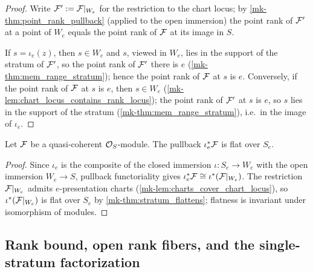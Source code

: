 \begin{proof}
  \leanok
  Write \(\mathcal{F}' := \mathcal{F}|_{W_e}\) for the restriction to the chart locus; by
  \ref{mk-thm:point_rank_pullback} (applied to the open immersion) the point
  rank of \(\mathcal{F}'\) at a point of \(W_e\) equals the point rank of \(\mathcal{F}\) at
  its image in \(S\).

  If \(s = \iota_e(z)\), then \(s \in W_e\) and \(s\), viewed in \(W_e\),
  lies in the support of the stratum of \(\mathcal{F}'\), so the point rank of
  \(\mathcal{F}'\) there is \(e\) (\ref{mk-thm:mem_range_stratum}); hence the point
  rank of \(\mathcal{F}\) at \(s\) is \(e\).  Conversely, if the point rank of
  \(\mathcal{F}\) at \(s\) is \(e\), then \(s \in W_e\)
  (\ref{mk-lem:chart_locus_contains_rank_locus}); the point rank of \(\mathcal{F}'\)
  at \(s\) is \(e\), so \(s\) lies in the support of the stratum
  (\ref{mk-thm:mem_range_stratum}), i.e.\ in the image of \(\iota_e\).
\end{proof}

\begin{theorem}
  \label{mk-thm:rank_stratum_flattens}
  \leanok

  Let \(\mathcal{F}\) be a quasi-coherent \(\mathcal{O}_S\)-module.  The pullback
  \(\iota_e^*\mathcal{F}\) is flat over \(S_e\).
\end{theorem}

\begin{proof}
  \leanok
  Since \(\iota_e\) is the composite of the closed immersion
  \(\iota : S_e \to W_e\) with the open immersion \(W_e \to S\), pullback
  functoriality gives \(\iota_e^*\mathcal{F} \cong \iota^*(\mathcal{F}|_{W_e})\).  The
  restriction \(\mathcal{F}|_{W_e}\) admits \(e\)-presentation charts
  (\ref{mk-lem:charts_cover_chart_locus}), so \(\iota^*(\mathcal{F}|_{W_e})\) is flat
  over \(S_e\) by \ref{mk-thm:stratum_flattens}; flatness is invariant under
  isomorphism of modules.
\end{proof}

\subsection{Rank bound, open rank fibers, and the single-stratum
  factorization}

